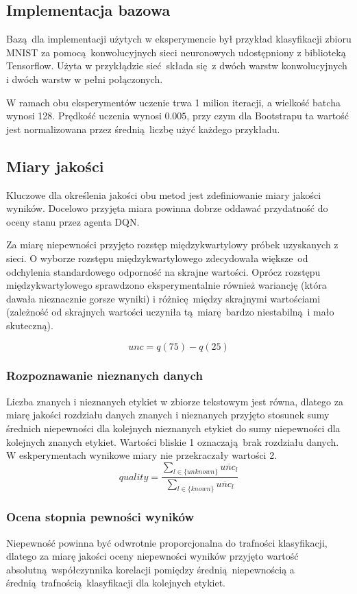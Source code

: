 \subsection{Implementacja bazowa}
Bazą dla implementacji użytych w eksperymencie był przykład klasyfikacji zbioru MNIST za pomocą konwolucyjnych sieci neuronowych udostępniony z biblioteką Tensorflow. Użyta w przykłądzie sieć składa się z dwóch warstw konwolucyjnych i dwóch warstw w pełni połączonych.

W ramach obu eksperymentów uczenie trwa 1 milion iteracji, a wielkość batcha wynosi 128. Prędkość uczenia wynosi $0.005$, przy czym dla Bootstrapu ta wartość jest normalizowana przez średnią liczbę użyć każdego przykładu.

\subsection{Miary jakości}
Kluczowe dla określenia jakości obu metod jest zdefiniowanie miary jakości wyników. Docelowo przyjęta miara powinna dobrze oddawać przydatność do oceny stanu przez agenta DQN.

Za miarę niepewności przyjęto rozstęp międzykwartylowy próbek uzyskanych z sieci. O wyborze rozstępu międzykwartylowego zdecydowała większe od odchylenia standardowego odporność na skrajne wartości. Oprócz rozstępu międzykwartylowego sprawdzono eksperymentalnie również wariancję (która dawała nieznacznie gorsze wyniki) i różnicę między skrajnymi wartościami (zależność od skrajnych wartości uczyniła tą miarę bardzo niestabilną i mało skuteczną).

\[ unc = q(75) -q(25)\]

\subsubsection{Rozpoznawanie nieznanych danych}
Liczba znanych i nieznanych etykiet w zbiorze tekstowym jest równa, dlatego za miarę jakości rozdziału danych znanych i nieznanych przyjęto stosunek sumy średnich niepewności dla kolejnych nieznanych etykiet do sumy niepewności dla kolejnych znanych etykiet. Wartości bliskie 1 oznaczają brak rozdziału danych. W eskperymentach wynikowe miary nie przekraczały wartości 2.
\[ quality = \frac{\sum_{l \in \{unknown\}} \overline{unc_{l}}}{\sum_{l \in \{known\}} \overline{unc_{l}}}\]

\subsubsection{Ocena stopnia pewności wyników }
Niepewność powinna być odwrotnie proporcjonalna do trafności klasyfikacji, dlatego za miarę jakości oceny niepewności wyników przyjęto wartość absolutną współczynnika korelacji pomiędzy średnią niepewnością a średnią trafnością klasyfikacji dla kolejnych etykiet.

